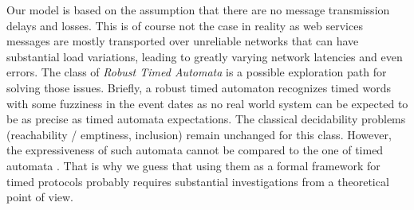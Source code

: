 
Our model is based on the assumption that there are no message transmission delays and losses. This is of course not the case in reality as web services messages are mostly transported over unreliable networks that can have substantial load variations, leading to greatly varying network latencies and even errors. The class of \emph{Robust Timed Automata} \cite{RAPM04} is a possible exploration path for solving those issues. Briefly, a robust timed automaton recognizes timed words with some fuzziness in the event dates as no real world system can be expected to be as precise as timed automata expectations. The classical decidability problems (reachability / emptiness, inclusion) remain unchanged for this class. However, the expressiveness of such automata cannot be compared to the one of timed automata \cite{RAPM04}. That is why we guess that using them as a formal framework for timed protocols probably requires substantial investigations from a theoretical point of view.

% 
% 
% 
% 
% 
%   
%   
%   
% 

